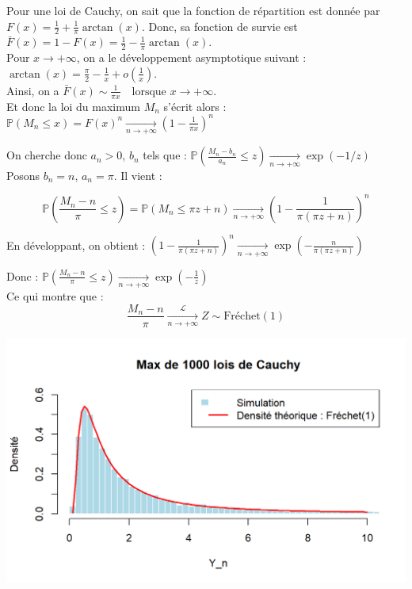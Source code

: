 \documentclass{article}
\theoremstyle{plain}
\theoremstyle{definition}
\theoremstyle{plain}
\begin{document}
\noindent Pour une loi de Cauchy, on sait que la fonction de répartition est donnée par $ F(x) = \frac{1}{2} + \frac{1}{\pi} \arctan(x) $. Donc, sa fonction de survie est $ \bar{F}(x) = 1 - F(x) = \frac{1}{2} - \frac{1}{\pi} \arctan(x) $. \\

\noindent Pour \( x \to +\infty \), on a le développement asymptotique suivant : $\arctan(x) = \frac{\pi}{2} - \frac{1}{x} + o\left(\frac{1}{x}\right) $. \\

\noindent Ainsi, on a $\bar{F}(x) \sim \frac{1}{\pi x} \quad \text{lorsque } x \to +\infty$. \\

\noindent Et donc la loi du maximum \( M_n \) s’écrit alors : $ \mathbb{P}(M_n \leq x) = F(x)^n \xrightarrow[n \to +\infty]{} \left(1 - \frac{1}{\pi x}\right)^n $


\noindent On cherche donc \( a_n > 0 \), \( b_n \) tels que : $ \mathbb{P}\left( \frac{M_n - b_n}{a_n} \leq z \right) \xrightarrow[n \to +\infty]{} \exp(-1/z) $ \\

\noindent Posons \( b_n = n \), \( a_n = \pi \). Il vient :

\[
\mathbb{P}\left( \frac{M_n - n}{\pi} \leq z \right) = \mathbb{P}\left( M_n \leq \pi z + n \right) \xrightarrow[n \to +\infty]{} \left(1 - \frac{1}{\pi(\pi z + n)}\right)^n
\]

\noindent En développant, on obtient : $\left(1 - \frac{1}{\pi(\pi z + n)}\right)^n \xrightarrow[n \to +\infty]{} \exp\left(- \frac{n}{\pi(\pi z + n)} \right)$

\noindent Donc : $\mathbb{P}\left( \frac{M_n - n}{\pi} \leq z \right) \xrightarrow[n \to +\infty]{} \exp\left(-\frac{1}{z} \right)$ \\

\noindent Ce qui montre que :
\[
\frac{M_n - n}{\pi} \xrightarrow[n \to +\infty]{\mathcal{L}} Z \sim \text{Fréchet}(1)
\]


\begin{center}
	\includegraphics[scale=0.8]{./images/Max_Cauchy.png} 
\end{center}
\end{document}
